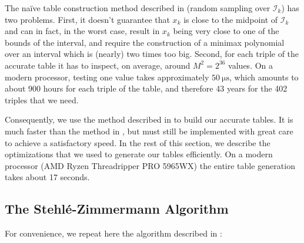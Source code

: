 \documentclass[10pt, a4paper, twoside]{basestyle}
\begin{document}
The naïve table construction method described in \cite{Gal1986} (random sampling over $\mathscr{I}_k$) has two problems.  First, it doesn't guarantee that $x_k$ is close to the midpoint of $\mathscr{I}_k$ and can in fact, in the worst case, result in $x_k$ being very close to one of the bounds of the interval, and require the construction of a minimax polynomial over an interval which is (nearly) two times too big.  Second, for each triple of the accurate table it has to inspect, on average, around $M^2 = 2^{36}$ values.  On a modern processor, testing one value takes approximately $\SI{50}{\micro\second}$, which amounts to about 900 hours for each triple of the table, and therefore 43 years for the 402 triples that we need.

Consequently, we use the method described in \cite{StehléZimmermann2005} to build our accurate tables.  It is much faster than the method in \cite{Gal1986}, but must still be implemented with great care to achieve a satisfactory speed.  In the rest of this section, we describe the optimizations that we used to generate our tables efficiently.  On a modern processor (AMD Ryzen Threadripper PRO 5965WX) the entire table generation takes about 17 seconds.

\subsection*{The Stehlé-Zimmermann Algorithm}

For convenience, we repeat here the algorithm described in \cite{StehléZimmermann2005}:
\end{document}
